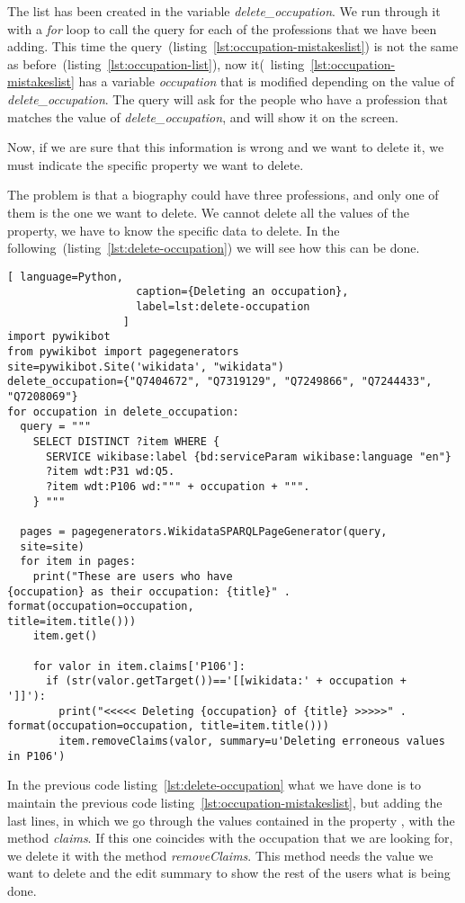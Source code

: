 The list has been created in the variable \textit{delete\_occupation}. We run through it with a \textit{for} loop to call the query for each of the professions that we have been adding. This time the query~(listing~\ref{lst:occupation-mistakeslist}) is not the same as before~(listing~\ref{lst:occupation-list}), now it(~listing~\ref{lst:occupation-mistakeslist} has a variable \textit{occupation} that is modified depending on the value of \textit{delete\_occupation}. The query will ask for the people who have a profession that matches the value of \textit{delete\_occupation}, and will show it on the screen.

Now, if we are sure that this information is wrong and we want to delete it, we must indicate the specific property we want to delete.

The problem is that a biography could have three professions, and only one of them is the one we want to delete. We cannot delete all the values of the property, we have to know the specific data to delete. In the following~(listing~\ref{lst:delete-occupation}) we will see how this can be done. 

\begin{lstlisting}[ language=Python,
                    caption={Deleting an occupation},
                    label=lst:delete-occupation
                  ]
import pywikibot
from pywikibot import pagegenerators
site=pywikibot.Site('wikidata', "wikidata")
delete_occupation={"Q7404672", "Q7319129", "Q7249866", "Q7244433", 
"Q7208069"}
for occupation in delete_occupation:
  query = """
    SELECT DISTINCT ?item WHERE {
      SERVICE wikibase:label {bd:serviceParam wikibase:language "en"}
      ?item wdt:P31 wd:Q5.
      ?item wdt:P106 wd:""" + occupation + """.
    } """

  pages = pagegenerators.WikidataSPARQLPageGenerator(query, 
  site=site)
  for item in pages:
    print("These are users who have
{occupation} as their occupation: {title}" . format(occupation=occupation, 
title=item.title()))
    item.get()

    for valor in item.claims['P106']:
      if (str(valor.getTarget())=='[[wikidata:' + occupation + 
']]'):
        print("<<<<< Deleting {occupation} of {title} >>>>>" . 
format(occupation=occupation, title=item.title()))
        item.removeClaims(valor, summary=u'Deleting erroneous values in P106')
\end{lstlisting} 

In the previous code listing~\ref{lst:delete-occupation} what we have done is to maintain the previous code listing~\ref{lst:occupation-mistakeslist}, but adding the last lines, in which we go through the values contained in the property , with the method \textit{claims}. If this one coincides with the occupation that we are looking for, we delete it with the method \textit{removeClaims}. This method needs the value we want to delete and the edit summary  to show the rest of the users what is being done.

